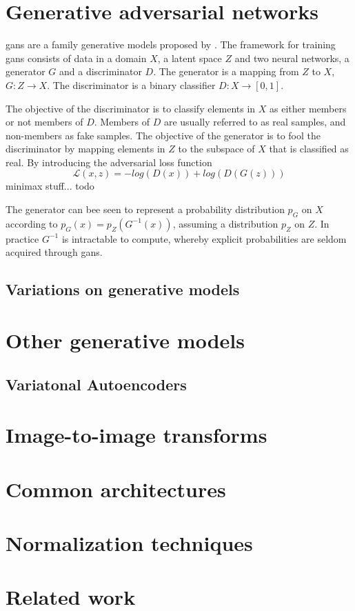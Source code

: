 \section{Generative adversarial networks}
\acrfull{gans} are a family generative models proposed by \textcite{goodfellow2014generative}. The framework for training \acrshort{gans} consists of data in a domain $X$, a latent space $Z$ and two neural networks, a generator $G$ and a discriminator $D$. The generator is a mapping from $Z$ to $X$, $G: Z \rightarrow X$. The discriminator is a binary classifier $D: X \rightarrow [0, 1]$. 

The objective of the discriminator is to classify elements in $X$ as either members or not members of $D$. Members of $D$ are usually referred to as real samples, and non-members as fake samples. The objective of the generator is to fool the discriminator by mapping elements in $Z$ to the subspace of $X$ that is classified as real. By introducing the adversarial loss function
\begin{equation}
    \mathcal{L}(x, z) = -log(D(x)) + log(D(G(z)))
\end{equation}
minimax stuff... todo

The generator can bee seen to represent a probability distribution $p_G$ on $X$ according to $p_G(x) = p_Z(G^{-1}(x))$, assuming a distribution $p_Z$ on $Z$. In practice $G^{-1}$ is intractable to compute, whereby explicit probabilities are seldom acquired through \acrshort{gans}.


\subsection{Variations on generative models}

\section{Other generative models}

\subsection{Variatonal Autoencoders}

\section{Image-to-image transforms}

\section{Common architectures}

\section{Normalization techniques}

\section{Related work}




